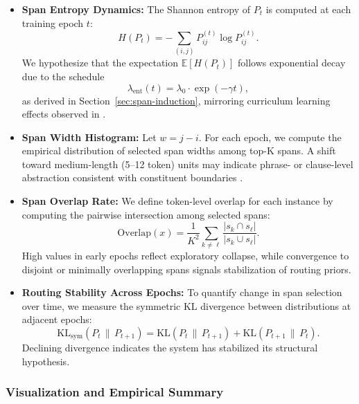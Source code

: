 \begin{itemize}[leftmargin=1.5em]
  \item \textbf{Span Entropy Dynamics:}
  The Shannon entropy of \(P_t\) is computed at each training epoch \(t\):
  \begin{equation}
  H(P_t) = -\sum_{(i,j)} P_{ij}^{(t)} \log P_{ij}^{(t)}.
  \end{equation}
  We hypothesize that the expectation \(\mathbb{E}[H(P_t)]\) follows exponential decay due to the schedule
  \[
  \lambda_{\mathrm{ent}}(t) = \lambda_0 \cdot \exp(-\gamma t),
  \]
  as derived in Section~\ref{sec:span-induction}, mirroring curriculum learning effects observed in \cite{bengio2009curriculum, kreutzer2021distilling}.

  \item \textbf{Span Width Histogram:}
  Let \(w = j - i\). For each epoch, we compute the empirical distribution of selected span widths among top-K spans. A shift toward medium-length (5–12 token) units may indicate phrase- or clause-level abstraction consistent with constituent boundaries \cite{naradowsky2021structured}.

  \item \textbf{Span Overlap Rate:}
  We define token-level overlap for each instance by computing the pairwise intersection among selected spans:
  \[
  \mathrm{Overlap}(x) = \frac{1}{K^2} \sum_{k \neq \ell} \frac{|s_k \cap s_\ell|}{|s_k \cup s_\ell|}.
  \]
  High values in early epochs reflect exploratory collapse, while convergence to disjoint or minimally overlapping spans signals stabilization of routing priors.

  \item \textbf{Routing Stability Across Epochs:}
  To quantify change in span selection over time, we measure the symmetric KL divergence between distributions at adjacent epochs:
  \[
  \mathrm{KL}_\mathrm{sym}(P_t \,\|\, P_{t+1}) = \mathrm{KL}(P_t \,\|\, P_{t+1}) + \mathrm{KL}(P_{t+1} \,\|\, P_t).
  \]
  Declining divergence indicates the system has stabilized its structural hypothesis.
\end{itemize}

\subsubsection*{Visualization and Empirical Summary}

